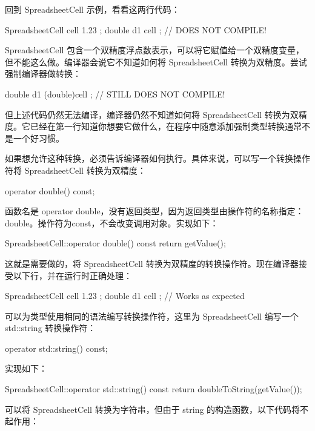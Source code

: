 
回到 SpreadsheetCell 示例，看看这两行代码：

\begin{cpp}
SpreadsheetCell cell { 1.23 };
double d1 { cell }; // DOES NOT COMPILE!
\end{cpp}

SpreadsheetCell 包含一个双精度浮点数表示，可以将它赋值给一个双精度变量，但不能这么做。编译器会说它不知道如何将 SpreadsheetCell 转换为双精度。尝试强制编译器做转换：

\begin{cpp}
double d1 { (double)cell }; // STILL DOES NOT COMPILE!
\end{cpp}

但上述代码仍然无法编译，编译器仍然不知道如何将 SpreadsheetCell 转换为双精度。它已经在第一行知道你想要它做什么，在程序中随意添加强制类型转换通常不是一个好习惯。

如果想允许这种转换，必须告诉编译器如何执行。具体来说，可以写一个转换操作符将 SpreadsheetCell 转换为双精度：

\begin{cpp}
operator double() const;
\end{cpp}

函数名是 operator double，没有返回类型，因为返回类型由操作符的名称指定：double。操作符为const，不会改变调用对象。实现如下：

\begin{cpp}
SpreadsheetCell::operator double() const
{
    return getValue();
}
\end{cpp}

这就是需要做的，将 SpreadsheetCell 转换为双精度的转换操作符。现在编译器接受以下行，并在运行时正确处理：

\begin{cpp}
SpreadsheetCell cell { 1.23 };
double d1 { cell }; // Works as expected
\end{cpp}

可以为类型使用相同的语法编写转换操作符，这里为 SpreadsheetCell 编写一个 std::string 转换操作符：

\begin{cpp}
operator std::string() const;
\end{cpp}

实现如下：

\begin{cpp}
SpreadsheetCell::operator std::string() const
{
    return doubleToString(getValue());
}
\end{cpp}

可以将 SpreadsheetCell 转换为字符串，但由于 string 的构造函数，以下代码将不起作用：

